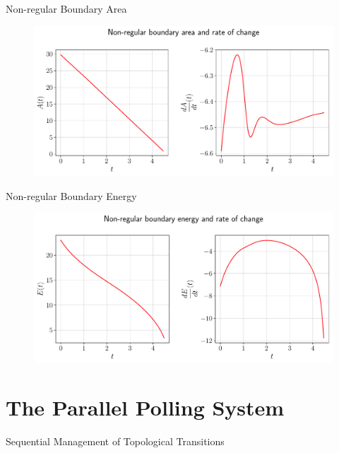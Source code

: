 \documentclass[usenames,dvipsnames]{beamer}
\begin{document}
\begin{frame}{Non-regular Boundary Area}
     \begin{figure}
        \centering
        \includegraphics[trim={0 0 0 0}, clip=true, scale=0.43]{figures/closed_boundary/nonregularboundary_area.pdf}
    \end{figure}  
\end{frame}

\begin{frame}{Non-regular Boundary Energy}
     \begin{figure}
        \centering
        \includegraphics[trim={0 0 0 0}, clip=true, scale=0.43]{figures/closed_boundary/nonregularboundary_energy.pdf}
    \end{figure}  
\end{frame}

\section{The Parallel Polling System}

\begin{frame}{Sequential Management of Topological Transitions}
    
\end{frame}
\end{document}
